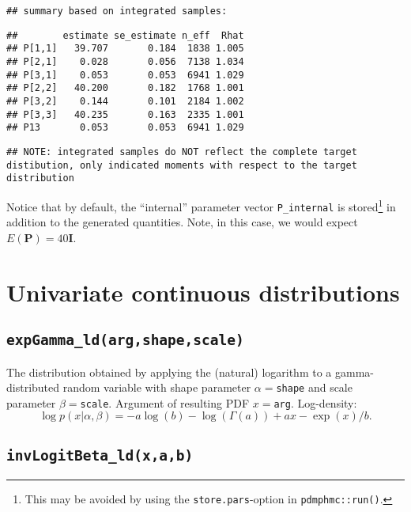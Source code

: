 \documentclass[
]{book}
\begin{document}
\begin{verbatim}
## summary based on integrated samples:
\end{verbatim}

\begin{verbatim}
##        estimate se_estimate n_eff  Rhat
## P[1,1]   39.707       0.184  1838 1.005
## P[2,1]    0.028       0.056  7138 1.034
## P[3,1]    0.053       0.053  6941 1.029
## P[2,2]   40.200       0.182  1768 1.001
## P[3,2]    0.144       0.101  2184 1.002
## P[3,3]   40.235       0.163  2335 1.001
## P13       0.053       0.053  6941 1.029
\end{verbatim}

\begin{verbatim}
## NOTE: integrated samples do NOT reflect the complete target distibution, only indicated moments with respect to the target distribution
\end{verbatim}

Notice that by default, the ``internal'' parameter vector \texttt{P\_internal} is stored\footnote{This may be avoided by using the \texttt{store.pars}-option in \texttt{pdmphmc::run()}.} in addition to the generated quantities. Note, in this case, we would expect \(E(\mathbf P)=40 \mathbf I\).

\hypertarget{univariate-continuous-distributions}{%
\section{Univariate continuous distributions}\label{univariate-continuous-distributions}}

\hypertarget{expgamma_ldargshapescale}{%
\subsection{\texorpdfstring{\texttt{expGamma\_ld(arg,shape,scale)}}{expGamma\_ld(arg,shape,scale)}}\label{expgamma_ldargshapescale}}

The distribution obtained by applying the (natural) logarithm to a gamma-distributed random variable with shape parameter \(\alpha=\)\texttt{shape} and scale parameter \(\beta=\)\texttt{scale}. Argument of resulting PDF \(x=\)\texttt{arg}. Log-density:
\[
\log p(x|\alpha,\beta) = -a\log(b) - \log(\Gamma(a)) + ax - \exp(x)/b.
\]

\hypertarget{invlogitbeta_ldxab}{%
\subsection{\texorpdfstring{\texttt{invLogitBeta\_ld(x,a,b)}}{invLogitBeta\_ld(x,a,b)}}\label{invlogitbeta_ldxab}}
\end{document}
